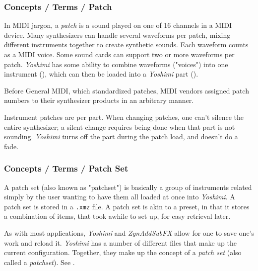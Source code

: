 \subsubsection{Concepts / Terms / Patch}
\label{subsubsec:concepts_terms_patch}

   In MIDI jargon, a \textsl{patch} is a sound played on
   one of 16 channels in a MIDI device. Many synthesizers
   can handle several waveforms per patch, mixing different
   instruments together to create synthetic sounds. Each waveform counts as
   a MIDI voice. Some sound cards can support two or more waveforms per
   patch.  \textsl{Yoshimi} has some ability to combine waveforms ("voices")
   into one instrument (),
   which can then be loaded into a
   \textsl{Yoshimi} part ().

   Before General MIDI, which standardized patches, MIDI vendors assigned
   patch numbers to their synthesizer products in an arbitrary manner.

   Instrument patches are per part.  When changing patches, one can't
   silence the entire synthesizer; a silent change requires being done
   when that part is not sounding. \textsl{Yoshimi} turns off the part
   during the patch load, and doesn't do a fade.
   

\subsubsection{Concepts / Terms / Patch Set}
\label{subsubsec:concepts_terms_patch_set}

   A patch set (also known as "patchset")
   is basically a group of instruments related simply by the user
   wanting to have them all loaded at once into \textsl{Yoshimi}.
   A patch set is stored in a \texttt{.xmz} file.
   A patch set is akin to a preset, in that it stores a combination of
   items, that took awhile to set up, for easy retrieval later.

   As with most applications, \textsl{Yoshimi} and \textsl{ZynAddSubFX}
   allow for one to save one's work and reload it.
   \textsl{Yoshimi} has a number of different files that make up the current
   configuration.
   Together, they make up the concept of a \textsl{patch set} (also called a
   \textsl{patchset}).
   See .

